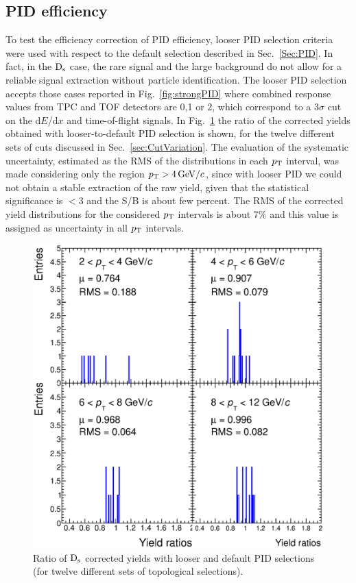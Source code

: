 \subsection{PID efficiency}
\label{sec:PIDsystPP}
To test the efficiency correction of PID efficiency, looser PID selection criteria were
used with respect to the default selection described in Sec.~\ref{Sec:PID}. 
In fact, in the ${\rm D_s}$ case, the rare signal and the large background 
do not allow for a reliable signal extraction without 
particle identification. The looser PID selection accepts those cases 
reported in Fig.~\ref{fig:strongPID} where combined response values from TPC and TOF 
detectors are 0,1 or 2, which correspond to a 3$\sigma$ cut on the d$E$/d$x$ and
time-of-flight signals.
In Fig.~\ref{fig:rmsPID} the ratio
of the corrected yields obtained with looser-to-default PID selection is shown, 
for the twelve different sets of cuts discussed in Sec.~\ref{sec:CutVariation}.
The evaluation of the systematic uncertainty, estimated as the RMS of the distributions in each $p_{\rm T}$ 
interval, was made considering only the region $p_{\rm T} > 4 \, \mathrm{GeV}/c$, since 
with looser PID we could not obtain a stable extraction of the raw yield, given 
that the statistical significance is $<3$ and the S/B is about few percent.
The RMS of the corrected yield distributions for the considered
$p_{\rm T}$ intervals is about 7\% and this value is assigned as uncertainty in all $p_{\rm T}$ intervals.

\begin{figure}[!htb]
\begin{center}
 \includegraphics[width=.7\textwidth]{FigCap4/PIDrms4x4}
\caption{Ratio of ${\rm D_s}$ corrected yields with looser and default PID selections (for twelve different sets of
topological selections).}
\label{fig:rmsPID}
\end{center}
\end{figure}

